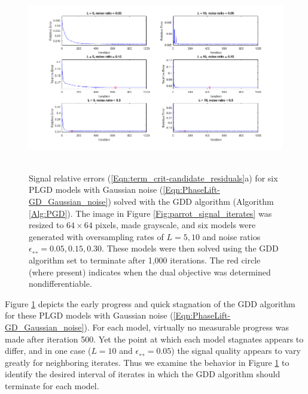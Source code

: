 \newpage

\begin{figure}[H]
\centering
\hbox{\hspace{-1.2cm} \includegraphics[scale=0.6]{term_crit-signal_err} }\vspace{-0.4cm}
\caption{Signal relative errors (\ref{Eqn:term_crit-candidate_residuals}a) for six PLGD models with Gaussian noise (\ref{Eqn:PhaseLift-GD_Gaussian_noise})  solved with the GDD algorithm (Algorithm \ref{Alg:PGD}). The image in Figure \ref{Fig:parrot_signal_iterates} was resized to $64 \times 64$ pixels, made grayscale, and six models were generated with oversampling rates of $L = 5, 10$ and noise ratios $\epsilon_\rel = 0.05, 0.15, 0.30$.  These models were then solved using the GDD algorithm set to terminate after 1,000 iterations.  The red circle (where present) indicates when the dual objective was determined nondifferentiable.}
\label{Fig:term_crit-signal_err}
\end{figure}

Figure \ref{Fig:term_crit-signal_err} depicts the early progress and quick stagnation of the GDD algorithm for these PLGD models with Gaussian noise (\ref{Eqn:PhaseLift-GD_Gaussian_noise}).  For each model, virtually no measurable progress was made after iteration 500.  Yet the point at which each model stagnates appears to differ, and in one case ($L = 10$ and $\epsilon_\rel = 0.05$) the signal quality appears to vary greatly for neighboring iterates.  Thus we examine the behavior in Figure \ref{Fig:term_crit-signal_err} to identify the desired interval of iterates in which the GDD algorithm should terminate for each model.




